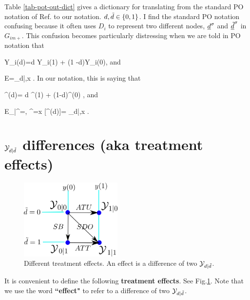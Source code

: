 Table \ref{tab-pot-out-dict}
gives a dictionary for 
translating
from the standard PO notation 
of Ref.\cite{book-mixtape}
to our notation. $d,{\tilde{d}}\in \{0,1\}$.
I find
 the standard PO notation 
confusing because it often uses $D_i$
to represent two different nodes, 
${\underline{d}}^\sigma$ and ${\underline{\tilde{d}}}^\sigma$ in $G_{im+}$. This confusion
becomes particularly distressing
when we are told in PO notation that

\beq Y_i(d)=d Y_i(1) + (1
-d)Y_i(0)\;,
\eeq
and

\beq
E\left[Y_i(d)|D_i=\td, X_i=x\right]
=\caly_{d|\td,x}
\;.
\eeq
In our notation,
this is saying that

\beq 
\rvy^\s(d)= d \rvy^\s(1) +
 (1-d)\rvy^\s(0)
\;,
\eeq
and

\beq
E_{\s|\rvtd^\s=\td, \rvx^\s=x}
[\rvy^\s(d)]=
\caly_{d|\td,x}
\label{eq-caly-def-ev}
\;.
\eeq



\section{${\cal Y}_{d|\tilde{d}}$
differences (aka treatment effects)}



\begin{figure}[h!]
\centering
\includegraphics[width=2in]
{pot-out/y-diffs-square.png}
\caption{Different treatment effects.  
An effect is a difference of 
two ${\cal Y}_{d|{\tilde{d}}}$.} 
\label{fig-y-diffs-square}
\end{figure}

It is convenient to
define the following 
{\bf treatment effects}. 
See Fig.\ref{fig-y-diffs-square}.
Note
that we use  the
word {\bf ``effect"} to
refer to 
a difference of two  ${\cal Y}_{d|{\tilde{d}}}$.

